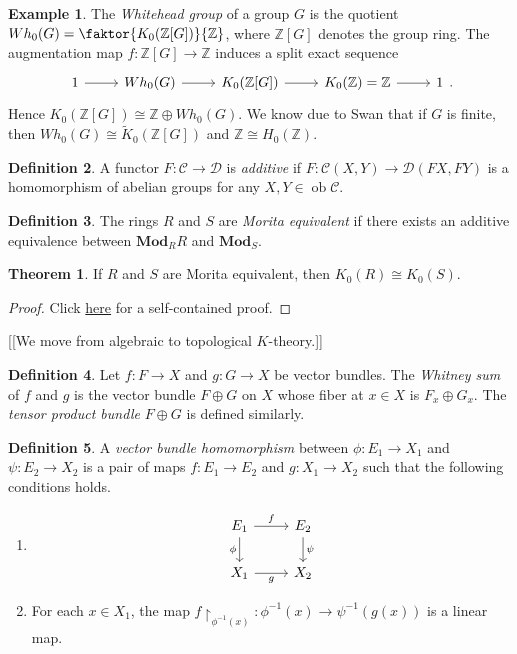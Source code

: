 \documentclass[10pt,letterpaper,cm]{nupset}
\theoremstyle{definition}
\newtheorem{definition}{Definition}
\newtheorem{exmp}[definition]{Example}
\theoremstyle{theorem}
\newtheorem{theorem}{Theorem}
\theoremstyle{remark}
\newcommand{\Z}{\mathbb Z}
\newcommand{\1}{\mathbf{1}}
\renewcommand{\c}{\mathscr{C}}
\renewcommand{\d}{\mathscr{D}}
\newcommand{\0}{\vec 0}
\DeclareMathOperator{\ob}{ob}
\begin{document}
\begin{exmp}
The \textit{Whitehead group} of a group $G$ is the quotient $Wh_0(G) =\faktor{K_0(\Z[G])}{\Z}$, where $\Z[G]$ denotes the group ring. The augmentation map $f: \Z[G] \to \Z$ induces a split exact sequence 
\[
\begin{tikzcd}
1 \arrow[r] & Wh_0(G) \arrow[r] & K_0(\Z[G]) \arrow[r] & K_0(\Z) =\mathbb Z \arrow[r] & 1
\end{tikzcd}.
\]
 Hence $K_0(\Z[G]) \cong \Z \oplus Wh_0(G)$. We know due to Swan that if $G$ is finite, then $Wh_0(G) \cong \widetilde{K}_0(\Z[G])$  and $\Z \cong H_0(\Z)$. 
\end{exmp}

\begin{definition}
A functor $F: \c \to \d$ is \textit{additive} if $F: \c(X, Y) \to \d(FX, FY)$ is a homomorphism of abelian groups for any $X, Y \in \ob \c$.
\end{definition}

\begin{definition}
The rings $R$ and $S$ are \textit{Morita equivalent} if there exists an additive equivalence between $\mathbf{Mod}_R$$R$ and $\mathbf{Mod}_S$. 
\end{definition}

\begin{theorem}
If $R$ and $S$ are Morita equivalent, then $K_0(R) \cong K_0(S)$.
\end{theorem}
\begin{proof}
Click \href{http://www.staff.science.uu.nl/~henri105/Seminars/AlgKthy2011Talk3.pdf}{here} for a self-contained proof.
\end{proof}

[[We move from algebraic to topological $K$-theory.]]

\begin{definition}
Let $f: F \to X$ and $g: G \to X$ be vector bundles. The \textit{Whitney sum} of $f$ and $g$ is the vector bundle $F \oplus G$ on $X$ whose fiber at $x \in X$ is $F_x \oplus G_x$.  The \textit{tensor product bundle} $F \oplus G$ is defined similarly.
\end{definition}

\begin{definition}
A \textit{vector bundle homomorphism} between $\phi : E_1 \to X_1$ and $\psi : E_2 \to X_2$ is a pair of maps $f: E_1 \to E_2$ and $g: X_1 \to X_2$ such that the following conditions holds.
\begin{enumerate}
\item 
\[
\begin{tikzcd}
E_1 \arrow[r, "f"] \arrow[d, "\phi"'] & E_2 \arrow[d, "\psi"] \\
X_1 \arrow[r, "g"'] & X_2
\end{tikzcd}
\]
\item For each $x \in X_1$, the map $f \restriction_{\phi^{-1}(x)} : \phi^{-1}(x) \to \psi^{-1}(g(x))$ is a linear map.
\end{enumerate}
\end{definition}
\end{document}

